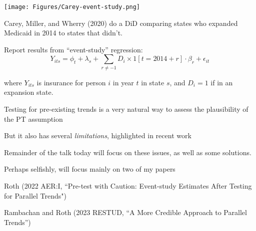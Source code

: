 \documentclass[aspectratio = 169, 13pt]{beamer}
\begin{document}
\begin{frame}
	\begin{minipage}{.5\linewidth}
		\texttt{[image: Figures/Carey-event-study.png]}
	\end{minipage}%
	\begin{minipage}{0.5\linewidth}
		\begin{wideitemize}
			\item
			Carey, Miller, and Wherry (2020) do a DiD comparing states who expanded Medicaid in 2014 to states that didn't. 
			
			\item
			Report results from ``event-study'' regression: 
			$$Y_{its} =  \phi_{t} + \lambda_s + \sum_{r\neq -1}  D_i \times 1[t = 2014 + r] \cdot  \beta_r   + \epsilon_{it} $$
			
			\noindent where $Y_{its}$ is insurance for person $i$ in year $t$ in state $s$, and $D_i = 1$ if in an expansion state.
		\end{wideitemize}
	\end{minipage}
	
\end{frame}

\begin{frame}
	
	\begin{wideitemize}
		
		\item
		Testing for pre-existing trends is a very natural way to assess the plausibility of the PT assumption
		
		\item
		But it also has several \textit{limitations}, highlighted in recent work \citep[][]{freyaldenhoven_pre-event_2019, kahn-lang_promise_2020, bilinski_seeking_2018, roth_pre-test_2021}
		
		\item
		Remainder of the talk today will focus on these issues, as well as some solutions. 
		
		\item
		Perhaps selfishly, will focus mainly on two of my papers
		
		\begin{wideitemize}
			\item
			Roth (2022 AER:I, ``Pre-test with Caution: Event-study Estimates After Testing for Parallel Trends") 
			\item
			Rambachan and Roth (2023 RESTUD, ``A More Credible Approach to Parallel Trends'') 
		\end{wideitemize}
		
		
	\end{wideitemize}
	
	
\end{frame}
\end{document}
